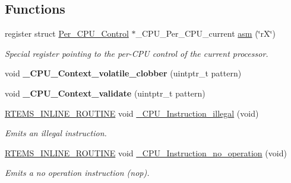 \subsection*{Functions}
\begin{DoxyCompactItemize}
\item 
register struct \mbox{\hyperlink{structPer__CPU__Control}{Per\+\_\+\+C\+P\+U\+\_\+\+Control}} $\ast$\+\_\+\+C\+P\+U\+\_\+\+Per\+\_\+\+C\+P\+U\+\_\+current \mbox{\hyperlink{group__RTEMSScoreCPUExample_ga04cbac6d343a5c80b8e4547131c6bfcd}{asm}} (\char`\"{}rX\char`\"{})
\begin{DoxyCompactList}\small\item\em Special register pointing to the per-\/\+C\+PU control of the current processor. \end{DoxyCompactList}\item 
\mbox{\label{group__RTEMSScoreCPUExample_gad26becade17fbdbb0bdf63c6b9228688}} 
void {\bfseries \+\_\+\+C\+P\+U\+\_\+\+Context\+\_\+volatile\+\_\+clobber} (uintptr\+\_\+t pattern)
\item 
\mbox{\label{group__RTEMSScoreCPUExample_ga3adb94b8d32fd0e3058934ffd3df6d90}} 
void {\bfseries \+\_\+\+C\+P\+U\+\_\+\+Context\+\_\+validate} (uintptr\+\_\+t pattern)
\item 
\mbox{\hyperlink{group__RTEMSScoreBaseDefs_gac216239df231d5dbd15e3520b0b9313f}{R\+T\+E\+M\+S\+\_\+\+I\+N\+L\+I\+N\+E\+\_\+\+R\+O\+U\+T\+I\+NE}} void \mbox{\hyperlink{group__RTEMSScoreCPUExample_ga07618c93359f2485af2e98a96b330208}{\+\_\+\+C\+P\+U\+\_\+\+Instruction\+\_\+illegal}} (void)
\begin{DoxyCompactList}\small\item\em Emits an illegal instruction. \end{DoxyCompactList}\item 
\mbox{\hyperlink{group__RTEMSScoreBaseDefs_gac216239df231d5dbd15e3520b0b9313f}{R\+T\+E\+M\+S\+\_\+\+I\+N\+L\+I\+N\+E\+\_\+\+R\+O\+U\+T\+I\+NE}} void \mbox{\hyperlink{group__RTEMSScoreCPUExample_gab683a0a37a089e2a0fd3c356836d5499}{\+\_\+\+C\+P\+U\+\_\+\+Instruction\+\_\+no\+\_\+operation}} (void)
\begin{DoxyCompactList}\small\item\em Emits a no operation instruction (nop). \end{DoxyCompactList}\end{DoxyCompactItemize}


